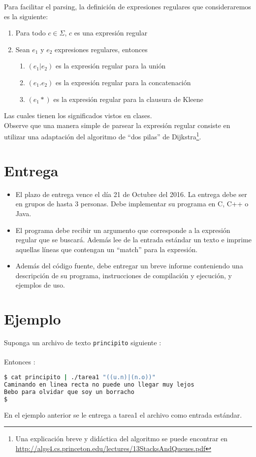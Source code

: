 \documentclass[dcc]{fcfmcourse}
\begin{document}
Para facilitar el parsing, la definición de expresiones regulares que consideraremos es la siguiente:
\begin{enumerate}
    \item Para todo $c \in \Sigma$, $c$ es una expresión regular
    \item Sean $e_{1}$ y $e_{2}$ expresiones regulares, entonces
    \begin{enumerate}
        \item $(e_{1}|e_{2})$ es la expresión regular para la unión
        \item $(e_{1}.e_{2})$ es la expresión regular para la concatenación
        \item $(e_{1}*)$ es la expresión regular para la clausura de Kleene
    \end{enumerate}
\end{enumerate}
Las cuales tienen los significados vistos en clases.\\

Observe que una manera simple de parsear la expresión regular consiste en utilizar una adaptación del algoritmo de ``dos pilas'' de Dijkstra\footnote{Una explicación breve y didáctica del algoritmo se puede encontrar en \url{http://algs4.cs.princeton.edu/lectures/13StacksAndQueues.pdf}}.
\section*{Entrega}
\begin{itemize}
    \item El plazo de entrega vence el día 21 de Octubre del 2016. La entrega debe ser en grupos de hasta 3 personas. Debe implementar su programa en C, C++ o Java.
    \item El programa debe recibir un argumento que corresponde a la expresión regular que se buscará. Además lee de la entrada estándar un texto e imprime aquellas líneas que contengan un ``match'' para la expresión.
    \item Además del código fuente, debe entregar un breve informe conteniendo una descripción de su programa, instrucciones de compilación y ejecución, y ejemplos de uso.
\end{itemize}
\section*{Ejemplo}
Suponga un archivo de texto \texttt{principito} siguiente :\\

\noindent{}\\

Entonces :
\begin{lstlisting}[language=bash]
$ cat principito | ./tarea1 "((u.n)|(n.o))"
Caminando en linea recta no puede uno llegar muy lejos
Bebo para olvidar que soy un borracho
$
\end{lstlisting}
En el ejemplo anterior se le entrega a tarea1 el archivo como entrada estándar.
\end{document}
